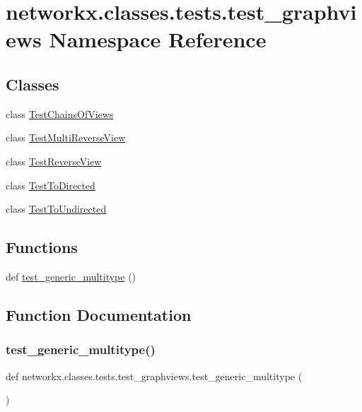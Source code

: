 \hypertarget{namespacenetworkx_1_1classes_1_1tests_1_1test__graphviews}{}\section{networkx.\+classes.\+tests.\+test\+\_\+graphviews Namespace Reference}
\label{namespacenetworkx_1_1classes_1_1tests_1_1test__graphviews}
\subsection*{Classes}
\begin{DoxyCompactItemize}
\item 
class \hyperlink{classnetworkx_1_1classes_1_1tests_1_1test__graphviews_1_1TestChainsOfViews}{Test\+Chains\+Of\+Views}
\item 
class \hyperlink{classnetworkx_1_1classes_1_1tests_1_1test__graphviews_1_1TestMultiReverseView}{Test\+Multi\+Reverse\+View}
\item 
class \hyperlink{classnetworkx_1_1classes_1_1tests_1_1test__graphviews_1_1TestReverseView}{Test\+Reverse\+View}
\item 
class \hyperlink{classnetworkx_1_1classes_1_1tests_1_1test__graphviews_1_1TestToDirected}{Test\+To\+Directed}
\item 
class \hyperlink{classnetworkx_1_1classes_1_1tests_1_1test__graphviews_1_1TestToUndirected}{Test\+To\+Undirected}
\end{DoxyCompactItemize}
\subsection*{Functions}
\begin{DoxyCompactItemize}
\item 
def \hyperlink{namespacenetworkx_1_1classes_1_1tests_1_1test__graphviews_ab635942ecb96f691c19acc29b699b097}{test\+\_\+generic\+\_\+multitype} ()
\end{DoxyCompactItemize}


\subsection{Function Documentation}
\mbox{\label{namespacenetworkx_1_1classes_1_1tests_1_1test__graphviews_ab635942ecb96f691c19acc29b699b097}} 
\subsubsection{\texorpdfstring{test\+\_\+generic\+\_\+multitype()}{test\_generic\_multitype()}}
{\footnotesize\ttfamily def networkx.\+classes.\+tests.\+test\+\_\+graphviews.\+test\+\_\+generic\+\_\+multitype (\begin{DoxyParamCaption}{ }\end{DoxyParamCaption})}

